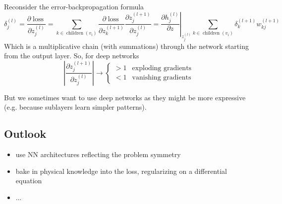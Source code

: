 Reconsider the error-backpropagation formula
\begin{equation}
    \delta_j^{(l)}=\frac{\partial \operatorname{loss}}{\partial z_j^{(l)}}=\sum_{k \in \operatorname{children}\left(v_i\right)} \frac{\partial \operatorname{loss}}{\partial z_k^{(l+1)}} \frac{\partial z_j^{(l+1)}}{\partial z_j^{(l)}}=\left.\frac{\partial h_j^{(l)}}{\partial z}\right|_{z_j^{(l)}} \sum_{k \in \operatorname{children}\left(v_i\right)} \delta_k^{(l+1)} w_{k j}^{(l+1)}
\end{equation}
Which is a multiplicative chain (with summations) through the network starting from 
the output layer. So, for deep networks
\begin{equation}
    \left| \frac{\partial z_j^{(l+1)}}{\partial z_j^{(l)}} \right| \rightarrow \begin{cases}
        > 1 & \text{exploding gradients} \\
        < 1 & \text{vanishing gradients}
    \end{cases}
\end{equation}

But we sometimes want to use deep networks as they might be more expressive (e.g.
because sublayers learn simpler patterns).


\subsection{Outlook}
\begin{itemize}
    \item use NN architectures reflecting the problem symmetry
    \item bake in physical knowledge into the loss, regularizing on a differential equation
    \item ...
\end{itemize}


\pagebreak